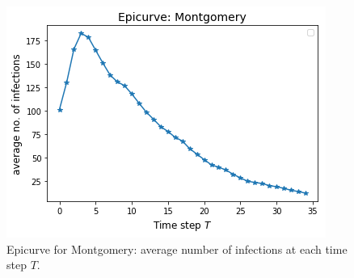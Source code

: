 
\begin{figure}[!h]
    \centering
    \includegraphics[scale = 0.5]{figures/epicurve.png}
    \caption{Epicurve for Montgomery: average number of infections at each time step $T$.}
    \label{fig:epicurve}
\end{figure}

